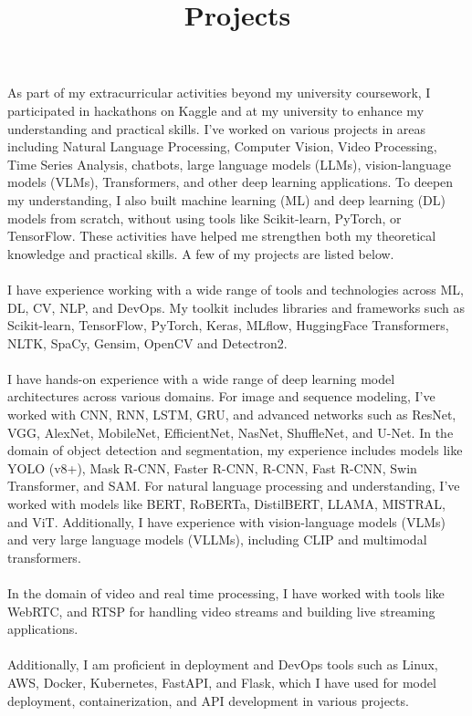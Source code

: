 \documentclass[a4paper,12pt]{article}
\date{}
\title {\textbf{Projects}}
\begin{document}
	\maketitle
	\vspace{-60pt} %
As part of my extracurricular activities beyond my university coursework, I participated in hackathons on Kaggle and at my university to enhance my understanding and practical skills. I’ve worked on various projects in areas including Natural Language Processing, Computer Vision, Video Processing, Time Series Analysis, chatbots, large language models (LLMs), vision-language models (VLMs), Transformers, and other deep learning applications. To deepen my understanding, I also built machine learning (ML) and deep learning (DL) models from scratch, without using tools like Scikit-learn, PyTorch, or TensorFlow. These activities have helped me strengthen both my theoretical knowledge and practical skills. A few of my projects are listed below.  
\\ 
\\
I have experience working with a wide range of tools and technologies across ML, DL, CV, NLP, and DevOps. My toolkit includes libraries and frameworks such as Scikit-learn, TensorFlow, PyTorch, Keras, MLflow, HuggingFace Transformers, NLTK, SpaCy, Gensim, OpenCV and Detectron2.
\\ \\
I have hands-on experience with a wide range of deep learning model architectures across various domains. For image and sequence modeling, I’ve worked with CNN, RNN, LSTM, GRU, and advanced networks such as ResNet, VGG, AlexNet, MobileNet, EfficientNet, NasNet, ShuffleNet, and U-Net. In the domain of object detection and segmentation, my experience includes models like YOLO (v8+), Mask R-CNN, Faster R-CNN, R-CNN, Fast R-CNN, Swin Transformer, and SAM. For natural language processing and understanding, I’ve worked with models like BERT, RoBERTa, DistilBERT, LLAMA, MISTRAL, and ViT. Additionally, I have experience with vision-language models (VLMs) and very large language models (VLLMs), including CLIP and multimodal transformers.
\\ \\
In the domain of video and real time processing, I have worked with tools like WebRTC, and RTSP for handling video streams and building live streaming applications.
\\ \\
Additionally, I am proficient in deployment and DevOps tools such as Linux, AWS, Docker, Kubernetes, FastAPI, and Flask, which I have used for model deployment, containerization, and API development in various projects.
\\
\\
\end{document}
